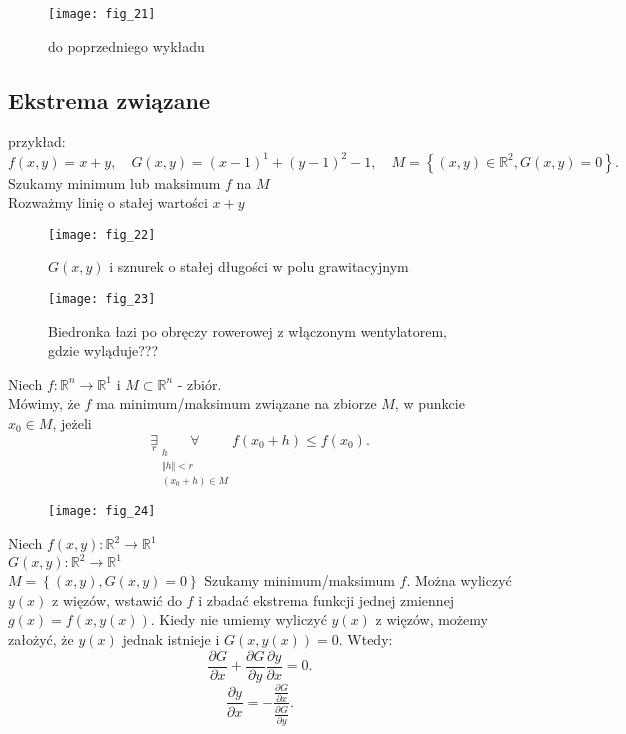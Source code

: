 \documentclass[../main.tex]{subfiles}
\begin{document}
    \begin{figure}
        \centering
        \texttt{[image: fig\_21]}
        \caption{do poprzedniego wykładu}
        \label{fig:fig_21}
    \end{figure}

    \subsection{Ekstrema związane}

    przykład:
    \[
        f(x,y) = x+y,\quad G(x,y) = (x-1)^1 + (y-1)^2 - 1,\quad M= \left \{ (x,y)\in\mathbb{R}^2,G(x,y) = 0\right \}
    .\]
    Szukamy minimum lub maksimum $f$ na $M$\\
    Rozważmy linię o stałej wartości $x+y$

    \begin{figure}
        \centering
        \texttt{[image: fig\_22]}
        \caption{$G(x,y)$ i sznurek o stałej długości w polu grawitacyjnym}
        \label{fig:fig_22}
    \end{figure}

    \begin{figure}
        \centering
        \texttt{[image: fig\_23]}
        \caption{Biedronka łazi po obręczy rowerowej z włączonym wentylatorem, gdzie wyląduje???}
        \label{fig:fig_23}
    \end{figure}

    \begin{definicja}
        Niech $f:\mathbb{R}^{n}\to\mathbb{R}^1$ i $M\subset \mathbb{R}^n$ - zbiór.\\
        Mówimy, że $f$ ma minimum/maksimum związane na zbiorze $M$, w punkcie $x_0\in M$, jeżeli
        \[
            \underset{r}{\exists} \underset{\substack{h\\  \Vert h \Vert < r \\ (x_0+h)\in M}}{\forall} f(x_0+h)\leq f(x_0)
    .\]
    \end{definicja}
    \begin{figure}
        \centering
        \texttt{[image: fig\_24]}
        \caption{}
        \label{fig:fig_24}
    \end{figure}

    Niech $f(x,y):\mathbb{R}^2\to\mathbb{R}^1$ \\
    $G(x,y): \mathbb{R}^2\to\mathbb{R}^1$\\
    $M = \left\{ (x,y), G(x,y) = 0 \right\} $
    Szukamy minimum/maksimum $f$. Można wyliczyć $y(x)$ z więzów, wstawić do $f$ i zbadać ekstrema funkcji jednej zmiennej $g(x) = f(x,y(x))$.
    Kiedy nie umiemy wyliczyć $y(x)$ z więzów, możemy założyć, że $y(x)$ jednak istnieje i $G(x,y(x)) = 0$. Wtedy:
    \[
    \frac{\partial G}{\partial x} + \frac{\partial G}{\partial y} \frac{\partial y}{\partial x} = 0
    .\]
    \[
        \frac{\partial y}{\partial x}  = - \frac{\frac{\partial G}{\partial x}}{\frac{\partial G}{\partial y} }
    .\]
\end{document}

